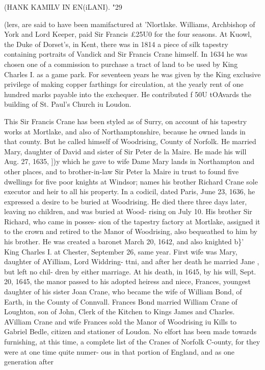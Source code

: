 \documentclass[oneside]{book}
\begin{document}
(HANK KAMILV IN EN(iLANI). "29 

(lers, are said to have been mamifactured at 'Nlortlake. Williams, 
Archbishop of York and Lord Keeper, paid Sir Francis £25U0 
for the four seasons. At Kuowl, the Duke of Dorset's, in Kent, 
there was in 1814 a piece of silk tapestry containing portraits of 
Vandick and Sir Francis Crane himself. In 1634 he was chosen 
one of a commission to purchase a tract of land to be used by 
King Charles I. as a game park. For seventeen years he was 
given by the King exclusive privilege of making copper farthings 
for circulation, at the yearly rent of one hundred marks payable 
into the exchequer. He contributed f 50U tOAvards the building 
of St. Paul's Church iu Loudon. 

This Sir Francis Crane has been styled as of Surry, on account 
of his tapestry works at Mortlake, and also of Northamptonshire, 
because he owned lands in that county. But he called himself of 
Woodrising, County of Norfolk. He married Mary, daughter of 
David and sister of Sir Peter de la Maire. He made his will 
Aug. 27, 1635, ])y which he gave to wife Dame Mary lands in 
Northampton and other places, and to brother-in-law Sir Peter la 
Maire iu trust to found five dwellings for five poor knights at 
Windsor; names his brother Richard Crane sole executor and 
heir to all his property. In a codicil, dated Paris, June 23, 1636, 
he expressed a desire to be buried at Woodrising. He died there 
three days later, leaving no children, and was buried at Wood- 
rising on July 10. His brother Sir Richard, who came in posses- 
sion of the tapestry factory at Mortlake, assigned it to the crown 
and retired to the Manor of Woodrising, also bequeathed to him 
by his brother. He was created a baronet March 20, 1642, and 
also knighted b\}' King Charles I. at Chester, September 26, same 
year. First wife was Mary, daughter of AYilliam, Lord Widdring- 
ttni, and after her death he married Jane , but left no chil- 
dren by either marriage. At his death, in 1645, by his will, 
Sept. 20, 1645, the manor passed to his adopted heiress and niece, 
Frances, youngest daughter of his sister Joan Crane, who became 
the wife of William Bond, of Earth, in the County of Connvall. 
Frances Bond married William Crane of Loughton, son of John, 
Clerk of the Kitchen to Kings James and Charles. AVilliam 
Crane and wife Frances sold the Manor of Woodrising iu Kills to 
Gabriel Bedle, citizen and stationer of Loudon. No elfort has 
been made towards furnishing, at this time, a complete list of the 
Cranes of Norfolk C-ounty, for they were at one time quite numer- 
ous in that portion of England, and as one generation after 
\end{document}
